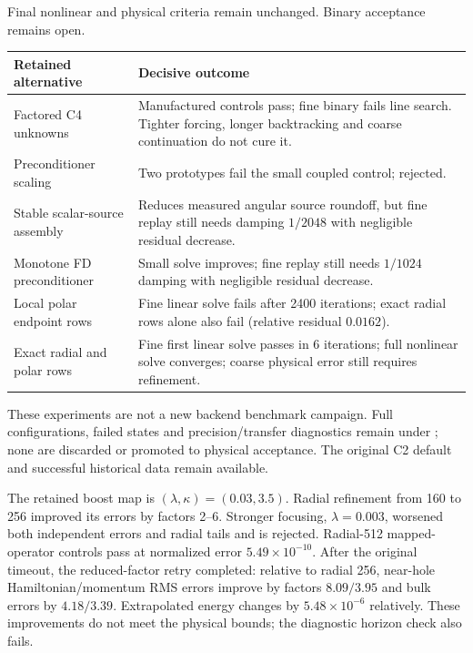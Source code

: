 \documentclass[aps,prd,preprint,notitlepage,nofootinbib]{revtex4-2}
\begin{document}
Final nonlinear and physical criteria remain unchanged. Binary acceptance
remains open.

\begin{center}\footnotesize
\begin{tabularx}{\linewidth}{@{}lX@{}}
\toprule
Retained alternative & Decisive outcome\\\midrule
Factored C4 unknowns & Manufactured controls pass; fine binary fails line search.
Tighter forcing, longer backtracking and coarse continuation do not cure it.\\
Preconditioner scaling & Two prototypes fail the small coupled control; rejected.\\
Stable scalar-source assembly & Reduces measured angular source roundoff, but
fine replay still needs damping $1/2048$ with negligible residual decrease.\\
Monotone FD preconditioner & Small solve improves; fine replay still needs
$1/1024$ damping with negligible residual decrease.\\
Local polar endpoint rows & Fine linear solve fails after 2400 iterations;
exact radial rows alone also fail (relative residual $0.0162$).\\
Exact radial and polar rows & Fine first linear solve passes in 6 iterations;
full nonlinear solve converges; coarse physical error still requires refinement.\\
\bottomrule
\end{tabularx}
\end{center}
These experiments are not a new backend benchmark campaign. Full configurations,
failed states and precision/transfer diagnostics remain under
; none are discarded or promoted to
physical acceptance. The original C2 default and successful historical data
remain available.

The retained boost map is $(\lambda,\kappa)=(0.03,3.5)$.
Radial refinement from 160 to 256 improved its errors by factors 2--6.
Stronger focusing, $\lambda=0.003$, worsened both independent errors and radial
tails and is rejected. Radial-512 mapped-operator controls pass at normalized
error $5.49\times10^{-10}$. After the original timeout, the reduced-factor
retry completed: relative to radial 256, near-hole Hamiltonian/momentum RMS
errors improve by factors $8.09/3.95$ and bulk errors by $4.18/3.39$.
Extrapolated energy changes by $5.48\times10^{-6}$ relatively. These improvements
do not meet the physical bounds; the diagnostic horizon check also fails.
\end{document}
